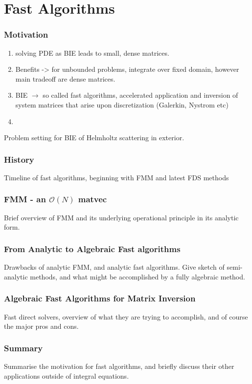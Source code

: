 \section{Fast Algorithms}

\begin{frame}
    \frametitle{Motivation}

    \begin{enumerate}
        \item solving PDE as BIE leads to small, dense matrices.
        \item Benefits -> for unbounded problems, integrate over fixed domain, however main tradeoff are dense matrices.
        \item BIE $\rightarrow$ so called fast algorithms, accelerated application and inversion of system matrices that arise upon discretization (Galerkin, Nystrom etc)
        \item 
    \end{enumerate}
\end{frame}

\begin{frame}
    Problem setting for BIE of Helmholtz scattering in exterior.
\end{frame}

\begin{frame}
    \frametitle{History}
    Timeline of fast algorithms, beginning with FMM and latest FDS methods
\end{frame}


\begin{frame}
    \frametitle{FMM - an $\mathcal{O}(N)$ matvec}

    Brief overview of FMM and its underlying operational principle in its analytic form.
\end{frame}

\begin{frame}
    \frametitle{From Analytic to Algebraic Fast algorithms}
    Drawbacks of analytic FMM, and analytic fast algorithms. Give sketch of semi-analytic methods, and what might be accomplished by a fully algebraic method.
\end{frame}


\begin{frame}
    \frametitle{Algebraic Fast Algorithms for Matrix Inversion}
    Fast direct solvers, overview of what they are trying to accomplish, and of course the major pros and cons.
\end{frame}


\begin{frame}
    \frametitle{Summary}
    Summarise the motivation for fast algorithms, and briefly discuss their other applications outside of integral equations.
\end{frame}

